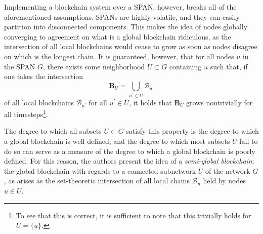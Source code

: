 Implementing a blockchain system over a SPAN, however, breaks all of the
aforementioned assumptions. SPANs are highly volatile, and they can easily
partition into disconnected components. This makes the idea of nodes
globally converging to agreement on what is a global blockchain ridiculous, as
the intersection of all local blockchains would cease to grow as soon as
nodes disagree on which is the longest chain. It is guaranteed, however,
that for all nodes $u$ in the SPAN $G$, there exists some neighborhood
$U\subset G$ containing $u$ such that, if one takes the intersection
$$\mathbf{B}_U=\bigcup_{u^\prime\in U}\mathcal{B}_{u^\prime}$$
of all local blockchains $\mathcal{B}_{u^\prime}$ for all $u^\prime\in U$, 
it holds that $\mathbf{B}_U$ grows nontrivially for all timesteps\footnote{To 
	see that this is correct, it is sufficient to note that this trivially
	holds for $U=\{u\}$.}.

The degree to which all subsets $U\subset G$ satisfy this property is the
degree to which a global blockchain is well defined, and the degree to which
most subsets $U$ fail to do so can serve as a measure of the degree to which
a global blockchain is poorly defined. For this reason, the authors present
the idea of a \textit{semi-global blockchain}: the global blockchain with regards
to a connected subnetwork $U$ of the network $G$, as arises
as the set-theoretic intersection of all local chains $\mathcal{B}_u$ held by
nodes $u\in U$.


